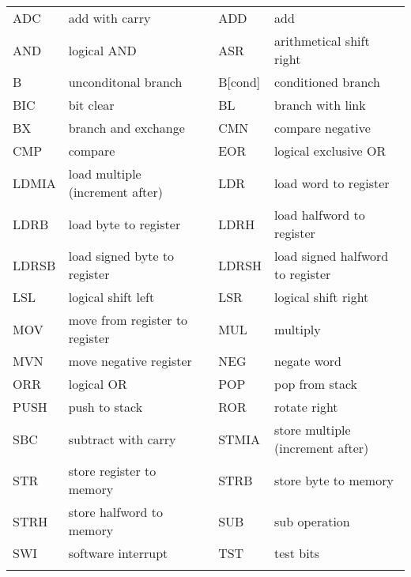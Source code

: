 \ttfamily
\small
\begin{tabular}{|m{1cm}|m{5cm}|p{1px}|m{1.3cm}|m{5.1cm}|}
	\hhline{--~--}
	ADC & add with carry &&	ADD & add \\
	\hhline{--~--}
	AND & logical AND &&	ASR & arithmetical shift right \\
	\hhline{--~--}
	B & unconditonal branch &&	B[cond] & conditioned branch \\
	\hhline{--~--}
	BIC & bit clear &&	BL & branch with link \\
	\hhline{--~--}
	BX & branch and exchange &&	CMN & compare negative \\
	\hhline{--~--}
	CMP & compare &&	EOR & logical exclusive OR \\
	\hhline{--~--}
	LDMIA & load multiple (increment after) &&	LDR & load word to register \\
	\hhline{--~--}
	LDRB & load byte to register &&	LDRH & load halfword to register \\
	\hhline{--~--}
	LDRSB & load signed byte to register &&	LDRSH & load signed halfword to register \\
	\hhline{--~--}
	LSL & logical shift left &&	LSR & logical shift right \\
	\hhline{--~--}
	MOV & move from register to register &&	MUL & multiply \\
	\hhline{--~--}
	MVN & move negative register &&	NEG & negate word \\
	\hhline{--~--}
	ORR & logical OR &&	POP & pop from stack \\
	\hhline{--~--}
	PUSH & push to stack &&	ROR & rotate right \\
	\hhline{--~--}
	SBC & subtract with carry &&	STMIA & store multiple (increment after) \\
	\hhline{--~--}
	STR & store register to memory &&	STRB & store byte to memory \\
	\hhline{--~--}
	STRH & store halfword to memory &&	SUB & sub operation \\
	\hhline{--~--}
	SWI & software interrupt &&	TST & test bits \\
	\hhline{--~--}
\end{tabular}
